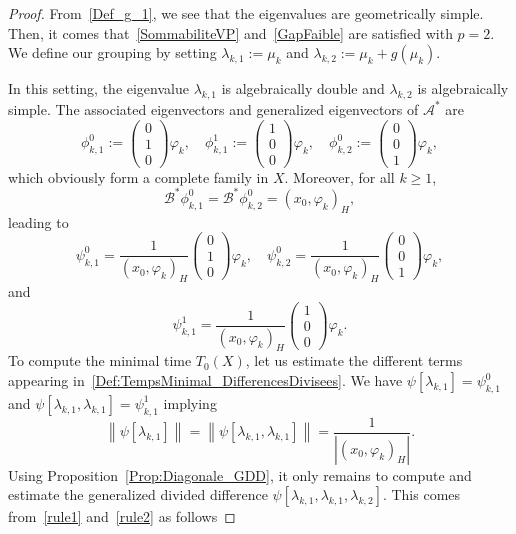\documentclass[AHL,Unicode,longabstracts]{cedram}
\newcommand\As{\mathcal{A}^*}
\newcommand\Bs{\mathcal{B}^*}
\newcommand{\normeX}[1]{\left\| #1 \right\|}
\newcommand{\psH}[2]{\left(#1, #2 \right)_H}
\begin{document}
\begin{proof}
From~\eqref{Def_g_1}, we see that the eigenvalues are geometrically simple. Then, it comes that~\eqref{SommabiliteVP} and~\eqref{GapFaible} are satisfied with $p=2$. We define our grouping by setting $\lambda_{k,1}:=\mu_k$ and $\lambda_{k,2}:=\mu_k+g(\mu_k)$.

In this setting, the eigenvalue $\lambda_{k,1}$ is algebraically double and $\lambda_{k,2}$ is algebraically simple. The associated eigenvectors and generalized eigenvectors of $\As$ are
\[
\phi_{k,1}^0 :=
\begin{pmatrix} 0 \\1\\0
\end{pmatrix} \varphi_k, \quad
\phi_{k,1}^1 :=
\begin{pmatrix} 1\\0\\0
\end{pmatrix} \varphi_k, \quad
\phi_{k,2}^0 :=
\begin{pmatrix} 0\\0\\1
\end{pmatrix} \varphi_k,
\]
which obviously form a complete family in $X$. Moreover, for all $k \geq 1$,
\[
\Bs \phi_{k,1}^0= \Bs \phi_{k,2}^0= \psH{x_0}{\varphi_k},
\]
leading to
\[
\psi_{k,1}^0 = \frac{1}{\psH{x_0}{\varphi_k}}
\begin{pmatrix} 0 \\1\\0
\end{pmatrix} \varphi_k,
\quad
\psi_{k,2}^0 = \frac{1}{\psH{x_0}{\varphi_k}}
\begin{pmatrix} 0\\0\\1
\end{pmatrix} \varphi_k,
\]
and
\[
\psi_{k,1}^1 = \frac{1}{\psH{x_0}{\varphi_k}}
\begin{pmatrix} 1\\0\\0
\end{pmatrix} \varphi_k.
\]
To compute the minimal time $T_0(X)$, let us estimate the different terms appearing in~\eqref{Def:TempsMinimal_DifferencesDivisees}. We have $\psi[\lambda_{k,1}]=\psi_{k,1}^0$ and $\psi[\lambda_{k,1}, \lambda_{k,1}] = \psi_{k,1}^1$ implying
\[
\normeX{\psi[\lambda_{k,1}]} = \normeX{\psi[\lambda_{k,1}, \lambda_{k,1}]} =\frac 1{ | \psH{x_0}{\varphi_k}|}.
\]
Using Proposition~\ref{Prop:Diagonale_GDD}, it only remains to compute and estimate the generalized divided difference $\psi[\lambda_{k,1},\lambda_{k,1},\lambda_{k,2}]$. This comes from~\eqref{rule1} and~\eqref{rule2} as follows

\end{proof}
\end{document}
